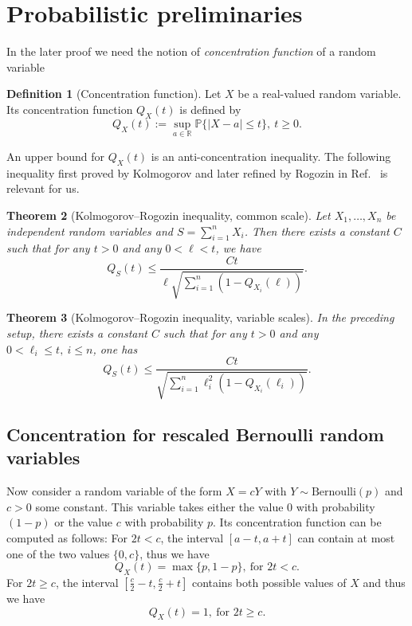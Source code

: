 \documentclass[aps,pra,reprint,superscriptaddress]{revtex4-2}
\newtheorem{theorem}{Theorem}
\theoremstyle{definition}
\newtheorem{definition}[theorem]{Definition}
\theoremstyle{remark}
\begin{document}
\section{Probabilistic preliminaries}\label{app:concentration}
In the later proof we need the notion of \emph{concentration function} of a
random variable 
\begin{definition}[Concentration function]\label{def:concentration_function}
    Let $X$ be a real-valued random variable. Its concentration function
    $Q_X(t)$ is defined by 
    \begin{equation}
        Q_X(t) := \sup_{a \in \mathbb{R}} \mathbb{P}\{ |X-a| \leq t \},\ t \geq 0.
    \end{equation}
\end{definition}
An upper bound for $Q_X(t)$ is an anti-concentration inequality. The following inequality first proved by Kolmogorov
\cite{Kolmogorov1958} and later refined by
Rogozin in Ref.~\cite{Rogozin:1961} is relevant for us.
\begin{theorem}[Kolmogorov--Rogozin inequality, common scale]
    Let $X_1, \hdots, X_n$ be independent random variables and $S =
    \sum_{i=1}^{n} X_i$. Then there exists a constant $C$ such that for any $t > 0$ and any $0< \ell < t$,
    we have 
    \begin{equation}
        Q_S(t) \leq  \frac{C t}{\ell \sqrt{\sum_{i=1}^{n}(1-Q_{X_i}(\ell))}}.
    \end{equation}
\end{theorem}
\begin{theorem}[Kolmogorov--Rogozin inequality, variable scales]
    In the preceding setup, there exists a constant $C$ such that for any $t >
    0$ and any $0< \ell_i \leq t,\ i \leq n$,
    one has 
    \begin{equation}
        Q_S(t) \leq  \frac{C t}{ \sqrt{\sum_{i=1}^{n}\ell_i^2(1-Q_{X_i}(\ell_i))}}.
    \end{equation}
\end{theorem}

\subsection{Concentration for rescaled Bernoulli random variables}\label{app:Bernoulli}
Now consider a random variable of the form $X = c Y$ with $Y \sim
\mathrm{Bernoulli}(p)$ and $c > 0$ some constant. This variable takes either
the value $0$ with probability $(1-p)$ or the value $c$ with probability $p$.
Its concentration function can be computed as
follows: For $2t < c$, the interval $[a-t,a+t]$ can contain at most one of the
two values $\{0,c\}$, thus we have 
\begin{equation}\label{eq:conc_b_1}
    Q_X(t) = \max\{p,1-p\},\ \text{for } 2t < c.
\end{equation}
For $2t \geq c$, the interval $[\frac{c}{2}-t,\frac{c}{2}+t]$ contains both
possible values of $X$ and thus we have
\begin{equation}\label{eq:conc_b_2}
    Q_{X}(t) = 1,\ \text{for } 2t \geq c.
\end{equation}
\end{document}
